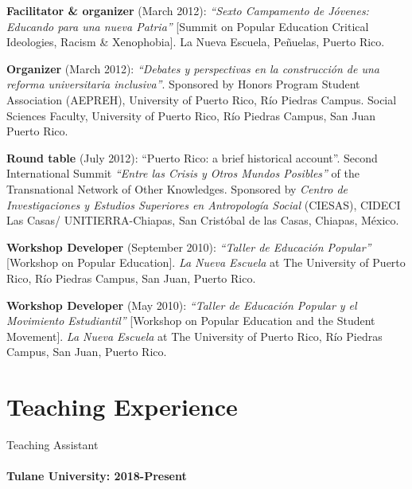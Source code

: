\documentclass[11pt,a4paper,]{awesome-cv}
\begin{document}
\textbf{Facilitator \& organizer} (March 2012): \emph{``Sexto Campamento
de Jóvenes: Educando para una nueva Patria''} {[}Summit on Popular
Education Critical Ideologies, Racism \& Xenophobia{]}. La Nueva
Escuela, Peñuelas, Puerto Rico.

\textbf{Organizer} (March 2012): \emph{``Debates y perspectivas en la
construcción de una reforma universitaria inclusiva''}. Sponsored by
Honors Program Student Association (AEPREH), University of Puerto Rico,
Río Piedras Campus. Social Sciences Faculty, University of Puerto Rico,
Río Piedras Campus, San Juan Puerto Rico.

\textbf{Round table} (July 2012): ``Puerto Rico: a brief historical
account''. Second International Summit \emph{``Entre las Crisis y Otros
Mundos Posibles''} of the Transnational Network of Other Knowledges.
Sponsored by \emph{Centro de Investigaciones y Estudios Superiores en
Antropología Social} (CIESAS), CIDECI Las Casas/ UNITIERRA-Chiapas, San
Cristóbal de las Casas, Chiapas, México.

\textbf{Workshop Developer} (September 2010): \emph{``Taller de
Educación Popular''} {[}Workshop on Popular Education{]}. \emph{La Nueva
Escuela} at The University of Puerto Rico, Río Piedras Campus, San Juan,
Puerto Rico.

\textbf{Workshop Developer} (May 2010): \emph{``Taller de Educación
Popular y el Movimiento Estudiantil''} {[}Workshop on Popular Education
and the Student Movement{]}. \emph{La Nueva Escuela} at The University
of Puerto Rico, Río Piedras Campus, San Juan, Puerto Rico.

\hypertarget{teaching-experience}{%
\section{\texorpdfstring{ Teaching
Experience}{ Teaching Experience}}\label{teaching-experience}}

Teaching Assistant

\hypertarget{tulane-university-2018-present}{%
\paragraph{Tulane University:
2018-Present}\label{tulane-university-2018-present}}
\end{document}
